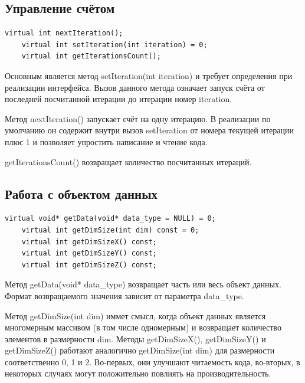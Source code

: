 \documentclass[a4paper,12pt]{extarticle}
\begin{document}
\subsection{Управление счётом}

\begin{lstlisting}[firstnumber=21,title=~~~~Запуск и остановка процесса моделирования происходит с использованием следующих функций:]
    virtual int nextIteration();
    virtual int setIteration(int iteration) = 0;
    virtual int getIterationsCount();
\end{lstlisting}

Основным является метод \textsf{setIteration(int iteration)} и требует определения при реализации интерфейса. Вызов данного метода означает запуск счёта от последней посчитанной итерации до итерации номер \textsf{iteration}.

Метод \textsf{nextIteration()} запускает счёт на одну итерацию. В реализации по умолчанию он содержит внутри вызов \textsf{setIteration} от номера текущей итерации плюс 1 и позволяет упростить написание и чтение кода.

\textsf{getIterationsCount()} возвращает количество посчитанных итераций.



\subsection{Работа с объектом данных}

\begin{lstlisting}[firstnumber=25,title=Получение объекта данных происохдит с ипользованием следующих функций:]
    virtual void* getData(void* data_type = NULL) = 0;
    virtual int getDimSize(int dim) const = 0;
    virtual int getDimSizeX() const;
    virtual int getDimSizeY() const;
    virtual int getDimSizeZ() const;
\end{lstlisting}

Метод \textsf{getData(void* data\_type)} возвращает часть или весь объект данных. Формат возвращаемого значения зависит от параметра \textsf{data\_type}.

Метод \textsf{getDimSize(int dim)} иммет смысл, когда объект данных является многомерным массивом (в том числе одномерным) и возвращает количество элементов в размерности \textsf{dim}. Методы \textsf{getDimSizeX()}, \textsf{getDimSizeY()} и \textsf{getDimSizeZ()} работают аналогично \textsf{getDimSize(int dim)} для размерности соответственно 0, 1 и 2. Во-первых, они улучшают читаемость кода, во-вторых, в некоторых случаях могут положительно повлиять на производительность.
\end{document}
